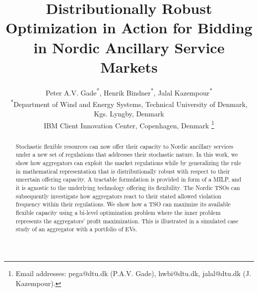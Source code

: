 \documentclass[conference]{IEEEtran}
\begin{document}
\title{Distributionally Robust Optimization in Action for Bidding in Nordic Ancillary Service Markets}

\author{Peter A.V. Gade\textsuperscript{*}\textsuperscript{\textdagger}, Henrik Bindner\textsuperscript{*}, Jalal Kazempour\textsuperscript{*} \\
    \textsuperscript{*}Department of Wind and Energy Systems, Technical University of Denmark, Kgs. Lyngby, Denmark \\
    \textsuperscript{\textdagger}IBM Client Innovation Center, Copenhagen, Denmark
    \thanks{
        Email addresses: pega@dtu.dk (P.A.V. Gade), hwbi@dtu.dk, jalal@dtu.dk (J. Kazempour).}%
    \vspace{-3mm}
}




\maketitle


\IEEEaftertitletext{\vspace{-0.8\baselineskip}}
\maketitle
\thispagestyle{plain}
\pagestyle{plain}
\begin{abstract}
    Stochastic flexible resources can now offer their capacity to Nordic ancillary services under a new set of regulations that addresses their stochastic nature. In this work, we show how aggregators can exploit the market regulations while by generalizing the rule in mathematical representation that is distributionally robust with respect to their uncertain offering capacity. A tractable formulation is provided in form of a \ac{MILP}, and it is agnostic to the underlying technology offering its flexibility. The Nordic \acp{TSO} can subsequently investigate how aggregators react to their stated allowed violation frequency within their regulations. We show how a \ac{TSO} can maximize its available flexible capacity using a bi-level optimization problem where the inner problem represents the aggregators' profit maximization. This is illustrated in a simulated case study of an aggregator with a portfolio of \acp{EV}.
\end{abstract}
\end{document}
